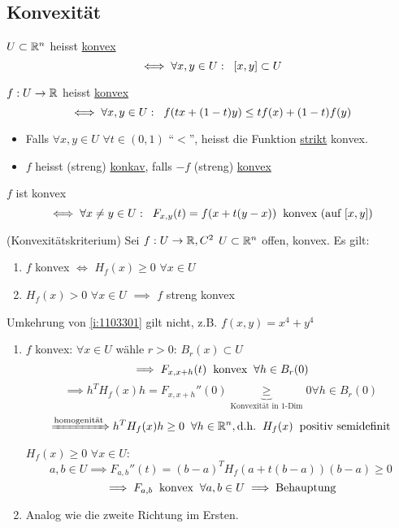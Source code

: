 \subsection{Konvexität}
\begin{Def}
  $U\subset\mathbb{R}^n$ heisst \ul{konvex}
  \[\iff \forall x,y\in U: \hspace{2mm} \left[ x,y \right]\subset U\]
\end{Def}
\begin{Def}
  $f:U\rightarrow\mathbb{R}$ heisst \ul{konvex}
  \[\iff \forall x,y\in U:\hspace{2mm} f(tx+(1-t)y)\leq tf(x)+(1-t)f(y)\]
  \begin{itemize}
    \item Falls $\forall x,y\in U$ $\forall t\in (0,1)$ ``$<$'', heisst die Funktion \ul{strikt} konvex.
    \item $f$ heisst (streng) \ul{konkav}, falls $-f$ (streng) \ul{konvex}
  \end{itemize}
\end{Def}
\begin{Bem}
  $f$ ist konvex
  \[\iff \forall x\neq y\in U:\hspace{2mm} F_{x,y}(t)=f(x+t(y-x))\hspace{2mm}\text{konvex (auf $\left[ x,y \right]$)}\]
\end{Bem}
\begin{Sat}
  (Konvexitätskriterium)
  Sei $f:U\rightarrow\mathbb{R}, C^2$ $U\subset\mathbb{R}^n$ offen, konvex. Es gilt:
  \begin{enumerate}
    \item $f$ konvex $\iff$ $H_f(x)\geq 0$ $\forall x\in U$
      \label{i:1103301}
    \item $H_f(x)>0$ $\forall x\in U$ $\implies$ $f$ streng konvex
      \label{i:1103302}
  \end{enumerate}
\end{Sat}
\begin{Bem}
  Umkehrung von \ref{i:1103301} gilt nicht, z.B. $f(x,y)=x^4+y^4$
\end{Bem}
\begin{Bew}
  \begin{enumerate}
    \item $f$ konvex: $\forall x\in U$ wähle $r>0$: $B_r(x)\subset U$
      \[\implies F_{x,x+h}(t)\hspace{2mm}\text{konvex}\hspace{2mm}\forall h\in B_r(0)\]
      \[\implies h^TH_f(x)h=F_{x,x+h}''(0)\underbrace{\geq}_{\text{Konvexität in 1-Dim}} 0\forall h\in B_r(0)\]
      \[\xRightarrow{\text{homogenität}}h^TH_f(x)h\geq 0\hspace{2mm}\forall h\in \mathbb{R}^n, \text{d.h.}\hspace{2mm} H_f(x)\hspace{2mm}\text{positiv semidefinit}\]
      $H_f(x)\geq 0$ $\forall x\in U$:
      \[a,b\in U\implies F_{a,b}''(t)=(b-a)^TH_f(a+t(b-a))(b-a)\geq 0\]
      \[\implies F_{a,b} \hspace{2mm}\text{konvex}\hspace{2mm}\forall a,b\in U\implies\text{Behauptung}\]
    \item Analog wie die zweite Richtung im Ersten.
  \end{enumerate}
\end{Bew}
